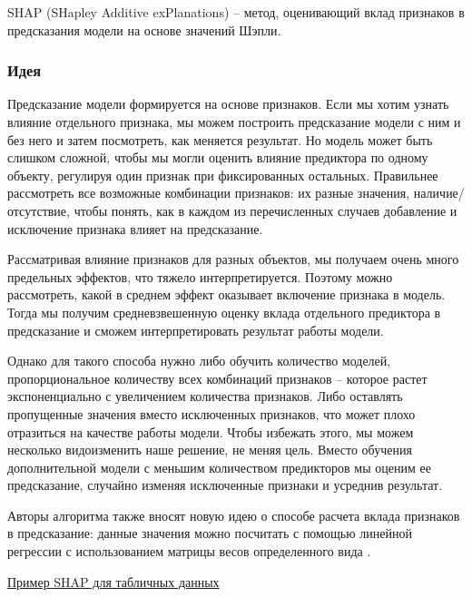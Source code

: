 \vspace{-1mm}
SHAP (SHapley Additive exPlanations) -- метод, оценивающий вклад признаков в предсказания модели на основе значений Шэпли.
\vspace{-3mm}

\subsubsection{Идея}
\vspace{-2mm}
Предсказание модели формируется на основе признаков. Если мы хотим узнать влияние отдельного признака, мы можем построить предсказание модели с ним и без него и затем посмотреть, как меняется результат. %
Но модель может быть слишком сложной, чтобы мы могли оценить влияние предиктора по одному объекту, регулируя один признак при фиксированных остальных. Правильнее рассмотреть все возможные комбинации признаков: их разные значения, наличие/отсутствие, чтобы понять, как в каждом из перечисленных случаев добавление и исключение признака влияет на предсказание.

Рассматривая влияние признаков для разных объектов, мы получаем очень много предельных эффектов, что тяжело интерпретируется. Поэтому можно рассмотреть, какой в среднем эффект оказывает включение признака в модель. Тогда мы получим средневзвешенную оценку вклада отдельного предиктора в предсказание и сможем интерпретировать результат работы модели.

Однако для такого способа нужно либо обучить количество моделей, пропорциональное количеству всех комбинаций признаков -- которое растет экспоненциально с увеличением количества признаков. Либо оставлять пропущенные значения вместо исключенных признаков, что может плохо отразиться на качестве работы модели. Чтобы избежать этого, мы можем несколько видоизменить наше решение, не меняя цель. Вместо обучения дополнительной модели с меньшим количеством предикторов мы оценим ее предсказание, случайно изменяя исключенные признаки и усреднив результат.

Авторы алгоритма также вносят новую идею о способе расчета вклада признаков в предсказание: данные значения можно посчитать с помощью линейной регрессии с использованием матрицы весов определенного вида \cite{shap}.

\underline{Пример SHAP для табличных данных} \cite{shapgit}

